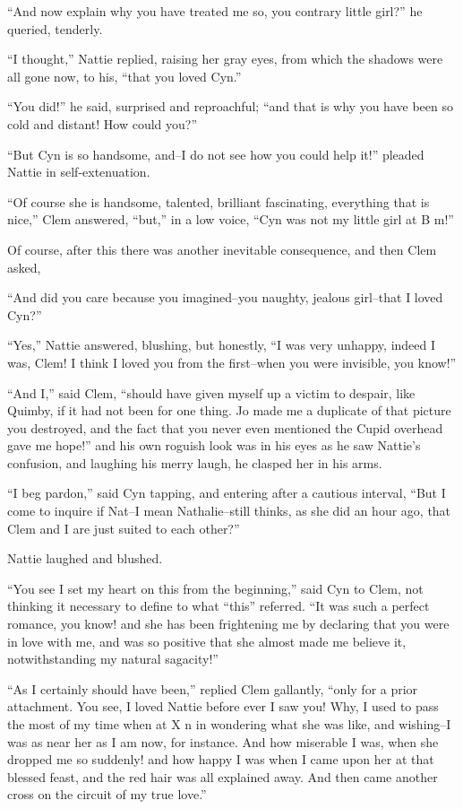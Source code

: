 ``And now explain why you have treated me so, you contrary little girl?''
he queried, tenderly.

``I thought,'' Nattie replied, raising her gray eyes, from which the
shadows were all gone now, to his, ``that you loved Cyn.''

``You did!'' he said, surprised and reproachful; ``and that is why you have
been so cold and distant! How could you?''

``But Cyn is so handsome, and--I do not see how you could help it!''
pleaded Nattie in self-extenuation.

``Of course she is handsome, talented, brilliant fascinating, everything
that is nice,'' Clem answered, ``but,'' in a low voice, ``Cyn was not my
little girl at B m!''

Of course, after this there was another inevitable consequence, and then
Clem asked,

``And did you care because you imagined--you naughty, jealous girl--that
I loved Cyn?''

``Yes,'' Nattie answered, blushing, but honestly, ``I was very unhappy,
indeed I was, Clem! I think I loved you from the first--when you were
invisible, you know!''

``And I,'' said Clem, ``should have given myself up a victim to despair,
like Quimby, if it had not been for one thing. Jo made me a duplicate of
that picture you destroyed, and the fact that you never even mentioned
the Cupid overhead gave me hope!'' and his own roguish look was in his
eyes as he saw Nattie's confusion, and laughing his merry laugh, he
clasped her in his arms.

``I beg pardon,'' said Cyn tapping, and entering after a cautious
interval, ``But I come to inquire if Nat--I mean Nathalie--still thinks,
as she did an hour ago, that Clem and I are just suited to each other?''

Nattie laughed and blushed.

``You see I set my heart on this from the beginning,'' said Cyn to Clem,
not thinking it necessary to define to what ``this'' referred. ``It was
such a perfect romance, you know! and she has been frightening me by
declaring that you were in love with me, and was so positive that she
almost made me believe it, notwithstanding my natural sagacity!''

``As I certainly should have been,'' replied Clem gallantly, ``only for a
prior attachment. You see, I loved Nattie before ever I saw you! Why, I
used to pass the most of my time when at X n in wondering what she was
like, and wishing--I was as near her as I am now, for instance. And how
miserable I was, when she dropped me so suddenly! and how happy I was
when I came upon her at that blessed feast, and the red hair was all
explained away. And then came another cross on the circuit of my true
love.''

